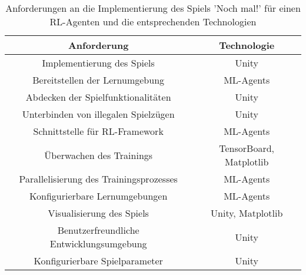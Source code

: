 \begin{table}[!h]
    \centering
    \label{tab:solveRequirements}
    \begin{tabular}{|c|c|}
    \hline
    \textbf{Anforderung} & \textbf{Technologie} \\
    \hline
    Implementierung des Spiels & Unity \\
    \hline
    Bereitstellen der Lernumgebung & ML-Agents \\
    \hline
    Abdecken der Spielfunktionalitäten & Unity \\
    \hline
    Unterbinden von illegalen Spielzügen & Unity \\
    \hline
    Schnittstelle für RL-Framework & ML-Agents \\
    \hline
    Überwachen des Trainings & TensorBoard, Matplotlib \\
    \hline
    Parallelisierung des Trainingsprozesses & ML-Agents \\
    \hline
    Konfigurierbare Lernumgebungen & ML-Agents \\
    \hline
    Visualisierung des Spiels & Unity, Matplotlib \\
    \hline
    Benutzerfreundliche Entwicklungsumgebung & Unity \\
    \hline
    Konfigurierbare Spielparameter & Unity \\
    \hline
    \end{tabular}
    \caption{Anforderungen an die Implementierung des Spiels 'Noch mal!' für einen RL-Agenten und die entsprechenden Technologien}
\end{table}



